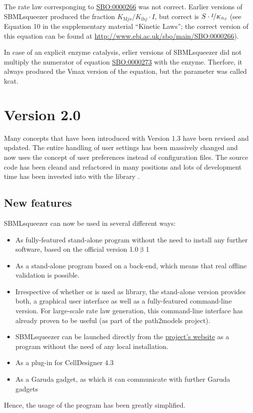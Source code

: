 The rate law corresponging to
\href{identifiers.org/biomodels.sbo/SBO:0000266}{SBO:0000266} was not correct.
Earlier versions of SBMLsqueezer produced the fraction $K_{\mathrm{M}js}/K_{\mathrm{ib}j}\cdot I$, but
correct is $S\cdot\nicefrac{I}{K_{\mathrm{ib}j}}$ (see Equation 10 in the supplementary material ``Kinetic
Laws''; the correct version of this equation can be found at
\url{http://www.ebi.ac.uk/sbo/main/SBO:0000266}).

In case of an explicit enzyme catalysis, erlier versions of SBMLsqueezer did not
multiply the numerator of equation
\href{identifiers.org/biomodels.sbo/SBO:0000273}{SBO:0000273} with the enzyme.
Therfore, it always produced the Vmax version of the equation, but the parameter
was called kcat.


\section{Version 2.0}

Many concepts that have been introduced with Version 1.3 have been revised and
updated. The entire handling of user settings has been massively changed and now
uses the concept of user preferences instead of configuration files. The source
code has been cleand and refactored in many positions and lots of development
time has been invested into with the library \JSBML.

\subsection{New features}

SBMLsqueezer can now be used in several different ways:
\begin{itemize}
\item As fully-featured stand-alone program without the need to install any
      further software, based on the official \JSBML version  1.0$\upbeta$1
\item As a stand-alone program based on a \libSBML back-end, which means that
      real offline \SBML validation is possible.
\item Irrespective of whether \JSBML or \libSBML is used as \SBML library, the
      stand-alone version provides both, a graphical user interface as well as
      a fully-featured command-line version. For large-scale rate law
      generation, this command-line interface has already proven to be useful
      (as part of the path2models project).
\item SBMLsqueezer can be launched directly from the
      \href{http://www.cogsys.cs.uni-tuebingen.de/software/SBMLsqueezer/}{project's website}
      as a \JavaWebStart program without the need of any local installation.
\item As a plug-in for CellDesigner 4.3
\item As a Garuda gadget, as which it can communicate with further Garuda
      gadgets
\end{itemize}
Hence, the usage of the program has been greatly simplified.


